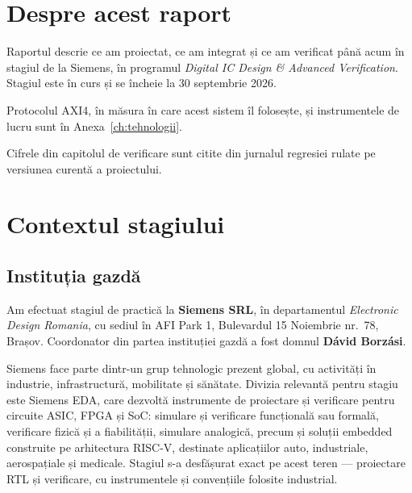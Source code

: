 \documentclass[11pt,openany]{report}
\begin{document}
\setcounter{page}{2}

\chapter*{Despre acest raport}

Raportul descrie ce am proiectat, ce am integrat și ce am verificat până acum în
stagiul de la Siemens, în programul \emph{Digital IC Design \& Advanced
Verification}. Stagiul este în curs și se încheie la 30 septembrie 2026.

Protocolul AXI4, în măsura în care acest sistem îl folosește, și instrumentele de
lucru sunt în Anexa~\ref{ch:tehnologii}.

Cifrele din capitolul de verificare sunt citite din jurnalul regresiei rulate pe
versiunea curentă a proiectului.

\tableofcontents
\listoffigures

\cleardoublepage
{}
\setcounter{page}{1}

\chapter{Contextul stagiului}
\label{ch:context}

\section{Instituția gazdă}

Am efectuat stagiul de practică la \textbf{Siemens SRL}, în departamentul
\emph{Electronic Design Romania}, cu sediul în AFI Park 1, Bulevardul 15
Noiembrie nr.~78, Brașov. Coordonator din partea instituției gazdă a fost domnul
\textbf{Dávid Borzási}.

Siemens face parte dintr-un grup tehnologic prezent global, cu activități în
industrie, infrastructură, mobilitate și sănătate. Divizia relevantă pentru
stagiu este Siemens EDA, care dezvoltă instrumente de proiectare și verificare
pentru circuite ASIC, FPGA și SoC: simulare și verificare funcțională sau
formală, verificare fizică și a fiabilității, simulare analogică, precum și
soluții embedded construite pe arhitectura RISC-V, destinate aplicațiilor auto,
industriale, aerospațiale și medicale. Stagiul s-a desfășurat exact pe acest
teren --- proiectare RTL și verificare, cu instrumentele și convențiile folosite
industrial.
\end{document}
